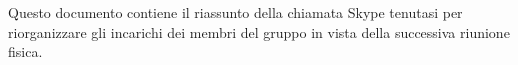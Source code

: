 Questo documento contiene il riassunto della chiamata Skype tenutasi per riorganizzare gli incarichi dei membri del gruppo in vista della successiva riunione fisica.

